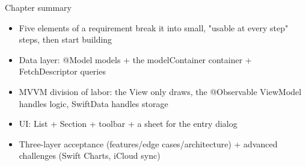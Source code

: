 \begin{tcbsummary}{Chapter summary}
\begin{itemize}
  \item Five elements of a requirement break it into small, "usable at every step" steps, then start building
  \item Data layer: @Model models + the modelContainer container + FetchDescriptor queries
  \item MVVM division of labor: the View only draws, the @Observable ViewModel handles logic, SwiftData handles storage
  \item UI: List + Section + toolbar + a sheet for the entry dialog
  \item Three-layer acceptance (features/edge cases/architecture) + advanced challenges (Swift Charts, iCloud sync)
\end{itemize}

\end{tcbsummary}
